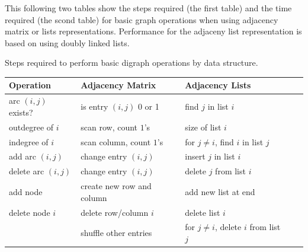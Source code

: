 This following two tables show the steps required (the first table) and the time required (the scond table) for basic graph operations when using 
adjacency matrix or lists representations.  Performance for the adjaceny list representation is based on using doubly linked lists.

\begin{samepage}
Steps required to perform basic digraph operations by data structure.
\begin{center}
\begin{tabular}{|l|l|l|l|l|}
\hline

\textbf{Operation} & \textbf{Adjacency Matrix} & \textbf{Adjacency Lists} \\
\hline

arc $(i, j)$ exists? & is entry $(i,j)$ 0 or 1  & find $j$ in  list $i$ \\
\hline
outdegree  of $i$ & scan row, count $1$'s & size of  list  $i$\\
\hline
indegree of $i$ & scan column,  count $1$'s & for $j\neq i$, find $i$ in list $j$ \\
\hline
add arc $(i, j)$ & change entry $(i ,j)$ & insert $j$ in list $i$ \\
\hline
delete arc $(i, j)$ & change entry $(i ,j)$ & delete $j$ from list $i$ \\
\hline
add node & create new row and column & add new list at end\\
\hline
delete node $i$ & delete row/column $i$  & delete list $i$ \\
& shuffle other entries & for $j\neq i$, delete  $i$ from list $j$ \\ 
\hline
\end{tabular}
\end{center}
\end{samepage}






